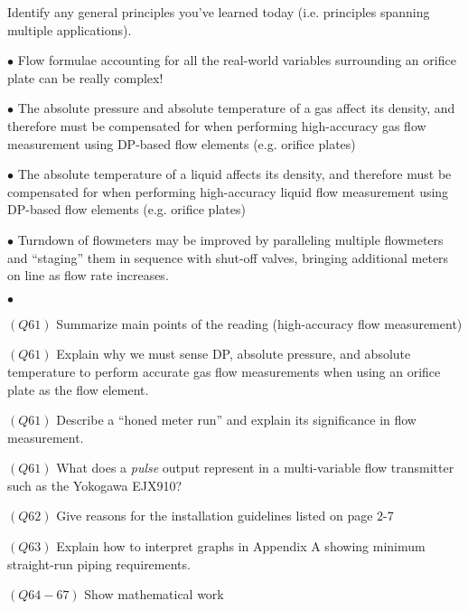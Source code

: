 \noindent
Identify any general principles you've learned today (i.e. principles spanning multiple applications).
\item{$\bullet$} Flow formulae accounting for all the real-world variables surrounding an orifice plate can be really complex!
\item{$\bullet$} The absolute pressure and absolute temperature of a gas affect its density, and therefore must be compensated for when performing high-accuracy gas flow measurement using DP-based flow elements (e.g. orifice plates)
\item{$\bullet$} The absolute temperature of a liquid affects its density, and therefore must be compensated for when performing high-accuracy liquid flow measurement using DP-based flow elements (e.g. orifice plates)
\item{$\bullet$} Turndown of flowmeters may be improved by paralleling multiple flowmeters and ``staging'' them in sequence with shut-off valves, bringing additional meters on line as flow rate increases.
\item{$\bullet$} 
\medskip

\medskip
\item{$(Q61)$} Summarize main points of the reading (high-accuracy flow measurement)
\item{$(Q61)$} Explain why we must sense DP, absolute pressure, and absolute temperature to perform accurate gas flow measurements when using an orifice plate as the flow element.
\item{$(Q61)$} Describe a ``honed meter run'' and explain its significance in flow measurement.
\item{$(Q61)$} What does a {\it pulse} output represent in a multi-variable flow transmitter such as the Yokogawa EJX910?
\item{$(Q62)$} Give reasons for the installation guidelines listed on page 2-7
\item{$(Q63)$} Explain how to interpret graphs in Appendix A showing minimum straight-run piping requirements.
\item{$(Q64-67)$} Show mathematical work
\medskip


